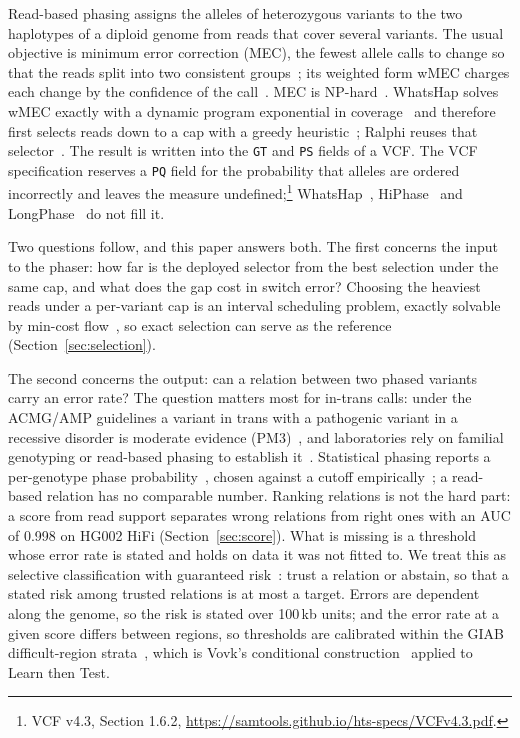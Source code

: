 \documentclass[11pt]{article}
\theoremstyle{definition}
\theoremstyle{remark}
\begin{document}
Read-based phasing assigns the alleles of heterozygous variants to the two
haplotypes of a diploid genome from reads that cover several variants. The
usual objective is minimum error correction (MEC), the fewest allele calls to
change so that the reads split into two consistent groups~\cite{lippert2002};
its weighted form wMEC charges each change by the confidence of the
call~\cite{greenberg2004}. MEC is NP-hard~\cite{lippert2002}. WhatsHap solves
wMEC exactly with a dynamic program exponential in coverage~\cite{patterson2015}
and therefore first selects reads down to a cap with a greedy
heuristic~\cite{martin2016,fischer2016}; Ralphi reuses that
selector~\cite{ralphi2025}. The result is written into the \texttt{GT} and
\texttt{PS} fields of a VCF. The VCF specification reserves a \texttt{PQ}
field for the probability that alleles are ordered incorrectly and leaves the
measure undefined;\footnote{VCF v4.3, Section 1.6.2,
\url{https://samtools.github.io/hts-specs/VCFv4.3.pdf}.}
WhatsHap~\cite{whatshap2015,whatshap2016}, HiPhase~\cite{hiphase} and
LongPhase~\cite{longphase} do not fill it.

Two questions follow, and this paper answers both. The first concerns the
input to the phaser: how far is the deployed selector from the best
selection under the same cap, and what does the gap cost in switch error?
Choosing the heaviest reads under a per-variant cap is an interval scheduling
problem, exactly solvable by min-cost flow~\cite{arkin1987,carlisle1995}, so
exact selection can serve as the reference (Section~\ref{sec:selection}).

The second concerns the output: can a relation between two phased variants
carry an error rate? The question matters most for in-trans calls: under the
ACMG/AMP guidelines a variant in trans with a pathogenic variant in a
recessive disorder is moderate evidence (PM3)~\cite{richards2015}, and
laboratories rely on familial genotyping or read-based phasing to establish
it~\cite{delgobbo2025}. Statistical phasing reports a per-genotype phase
probability~\cite{shapeit5}, chosen against a cutoff
empirically~\cite{lassen2024}; a read-based relation has no comparable
number. Ranking relations is not the hard part: a score from read support
separates wrong relations from right ones with an AUC of 0.998 on HG002 HiFi
(Section~\ref{sec:score}). What is missing is a threshold whose error rate is
stated and holds on data it was not fitted to. We treat this as selective
classification with guaranteed risk~\cite{geifman2017,ltt2025}: trust a
relation or abstain, so that a stated risk among trusted relations is at most
a target. Errors are dependent along the genome, so the risk is stated over
100\,kb units; and the error rate at a given score differs between regions,
so thresholds are calibrated within the GIAB difficult-region
strata~\cite{dwarshuis2024}, which is Vovk's conditional
construction~\cite{vovk2012} applied to Learn then Test.
\end{document}
